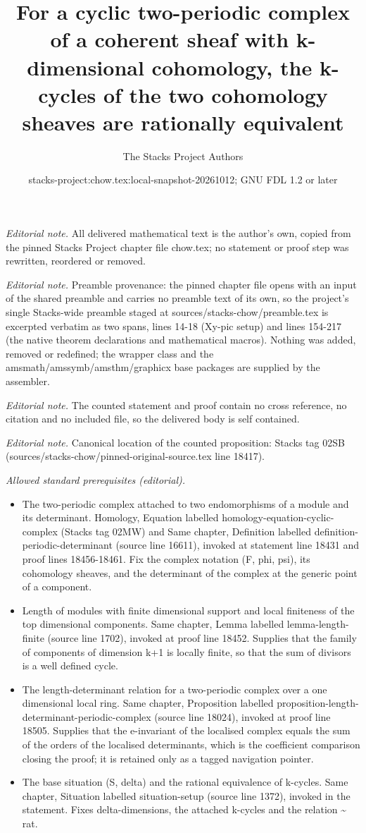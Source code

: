 \documentclass[10pt,a4paper]{amsart}
\title{For a cyclic two-periodic complex of a coherent sheaf with k-dimensional cohomology, the k-cycles of the two cohomology sheaves are rationally equivalent}
\author{The Stacks Project Authors}
\date{stacks-project:chow.tex:local-snapshot-20261012; GNU FDL 1.2 or later}
\theoremstyle{plain}
\theoremstyle{definition}
\theoremstyle{remark}
\numberwithin{equation}{subsection}
\begin{document}
\maketitle
\noindent\textit{Editorial note.} All delivered mathematical text is the author's own, copied from the pinned Stacks Project chapter file chow.tex; no statement or proof step was rewritten, reordered or removed.\par\medskip
\noindent\textit{Editorial note.} Preamble provenance: the pinned chapter file opens with an input of the shared preamble and carries no preamble text of its own, so the project's single Stacks-wide preamble staged at sources/stacks-chow/preamble.tex is excerpted verbatim as two spans, lines 14-18 (Xy-pic setup) and lines 154-217 (the native theorem declarations and mathematical macros). Nothing was added, removed or redefined; the wrapper class and the amsmath/amssymb/amsthm/graphicx base packages are supplied by the assembler.\par\medskip
\noindent\textit{Editorial note.} The counted statement and proof contain no cross reference, no citation and no included file, so the delivered body is self contained.\par\medskip
\noindent\textit{Editorial note.} Canonical location of the counted proposition: Stacks tag 02SB (sources/stacks-chow/pinned-original-source.tex line 18417).\par\medskip
\noindent\textit{Allowed standard prerequisites (editorial).}\begin{itemize}
\item The two-periodic complex attached to two endomorphisms of a module and its determinant. Homology, Equation labelled homology-equation-cyclic-complex (Stacks tag 02MW) and Same chapter, Definition labelled definition-periodic-determinant (source line 16611), invoked at statement line 18431 and proof lines 18456-18461. Fix the complex notation (F, phi, psi), its cohomology sheaves, and the determinant of the complex at the generic point of a component.
\item Length of modules with finite dimensional support and local finiteness of the top dimensional components. Same chapter, Lemma labelled lemma-length-finite (source line 1702), invoked at proof line 18452. Supplies that the family of components of dimension k+1 is locally finite, so that the sum of divisors is a well defined cycle.
\item The length-determinant relation for a two-periodic complex over a one dimensional local ring. Same chapter, Proposition labelled proposition-length-determinant-periodic-complex (source line 18024), invoked at proof line 18505. Supplies that the e-invariant of the localised complex equals the sum of the orders of the localised determinants, which is the coefficient comparison closing the proof; it is retained only as a tagged navigation pointer.
\item The base situation (S, delta) and the rational equivalence of k-cycles. Same chapter, Situation labelled situation-setup (source line 1372), invoked in the statement. Fixes delta-dimensions, the attached k-cycles and the relation \textasciitilde{} rat.
\end{itemize}\medskip
\end{document}
